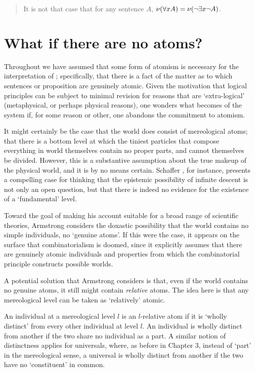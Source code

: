 \begin{quote}
It is not that case that for any sentence $A$, $\mathcal{\nu}(\forall xA)=\mathcal{\nu}(\neg\exists x\neg A)$.
\end{quote}

\noindent

\section{What if there are no atoms?}\label{atomless}

Throughout we have assumed that some form of atomism is necessary for the interpretation of \GO; specifically, that there is a fact of the matter as to which sentences or proposition are genuinely atomic. Given the motivation that logical principles can be subject to minimal revision for reasons that are `extra-logical' (metaphysical, or perhaps physical reasons), one wonders what becomes of the system if, for some reason or other, one abandons the commitment to atomism.

It might certainly be the case that the world does consist of mereological atoms; that there is a bottom level at which the tiniest particles that compose everything in world themselves contain no proper parts, and cannot themselves be divided. However, this is a substantive assumption about the true makeup of the physical world, and it is by no means certain. Schaffer \citeyear{Schaffer:03}, for instance, presents a compelling case for thinking that the epistemic possibility of infinite descent is not only an open question, but that there is indeed no evidence for the existence of a `fundamental' level.

Toward the goal of making his account suitable for a broad range of scientific theories, Armstrong considers the doxastic possibility that the world contains no simple individuals, no `genuine atoms'. If this were the case, it appears on the surface that combinatorialism is doomed, since it explicitly assumes that there are genuinely atomic individuals and properties from which the combinatorial principle constructs possible worlds. 

A potential solution that Armstrong considers is that, even if the world contains no genuine atoms, it still might contain \emph{relative} atoms. The idea here is that any mereological level can be taken as `relatively' atomic.

An individual at a mereological level $l$ is an $l$-relative atom if it is `wholly distinct' from every other individual at level $l$. An individual is wholly distinct from another if the two share no individual as a part. A similar notion of distinctness applies for universals, where, as before in Chapter 3, instead of `part' in the mereological sense, a universal is wholly distinct from another if the two have no `constituent' in common. 

